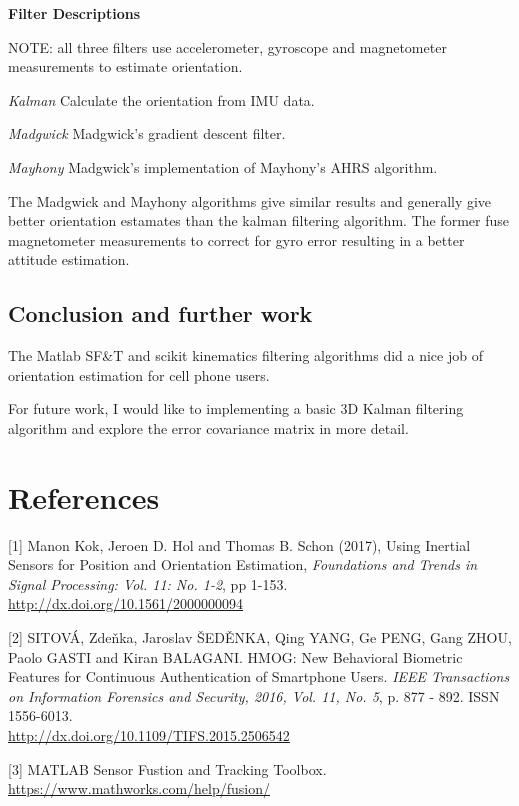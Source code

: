 \documentclass{article}
\begin{document}
\textbf{Filter Descriptions}

NOTE: all three filters use accelerometer, gyroscope and magnetometer measurements to estimate orientation.

\textit{Kalman} Calculate the orientation from IMU data.

\textit{Madgwick} Madgwick’s gradient descent filter.

\textit{Mayhony} Madgwick’s implementation of Mayhony’s AHRS algorithm.

The Madgwick and Mayhony algorithms give similar results and generally give better orientation estamates than
the kalman filtering algorithm. The former fuse magnetometer measurements to correct for gyro error resulting
in a better attitude estimation.

\subsection{Conclusion and further work}

The Matlab SF\&T and scikit kinematics filtering algorithms did a nice job of orientation estimation for cell phone users.

For future work, I would like to implementing a basic 3D Kalman filtering algorithm and explore the error covariance matrix in more detail.

\section*{References}

\small

[1] Manon Kok, Jeroen D. Hol and Thomas B. Schon (2017), Using
Inertial Sensors for Position and Orientation Estimation,
{\it Foundations and Trends in Signal Processing: Vol. 11: No. 1-2},
pp 1-153. \\ \url{http://dx.doi.org/10.1561/2000000094}

[2] SITOVÁ, Zdeňka, Jaroslav ŠEDĚNKA, Qing YANG, Ge PENG, Gang ZHOU,
Paolo GASTI and Kiran BALAGANI. HMOG: New Behavioral Biometric Features
for Continuous Authentication of Smartphone Users. {\it IEEE Transactions on
Information Forensics and Security, 2016, Vol. 11, No. 5}, p. 877 - 892.
ISSN 1556-6013. \\ \url{http://dx.doi.org/10.1109/TIFS.2015.2506542}

[3] MATLAB Sensor Fustion and Tracking Toolbox. \\ \url{https://www.mathworks.com/help/fusion/}
\end{document}
